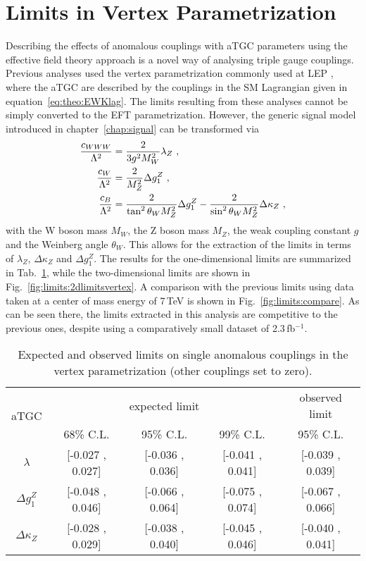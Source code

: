 \section{Limits in Vertex Parametrization}
\label{sec:vertex}
Describing the effects of anomalous couplings with aTGC parameters using the effective field theory approach is a novel way of analysing triple gauge couplings. Previous analyses used the vertex parametrization commonly used at LEP \cite{LEPatgc}, where the aTGC are described by the couplings in the SM Lagrangian given in equation~\ref{eq:theo:EWKlag}. The limits resulting from these analyses cannot be simply converted to the EFT parametrization. However, the generic signal model introduced in chapter~\ref{chap:signal} can be transformed via
\begin{align}
\frac{c_{WWW}}{\Lambda^2} &= \frac{2}{3g^2M_W^2}\lambda_Z ~, \\
\frac{c_{W}}{\Lambda^2}  &= \frac{2}{M_Z^2}\Delta g_1^Z ~, \\
\frac{c_{B}}{\Lambda^2}   &= \frac{2}{\tan^2\theta_W M_Z^2}\Delta g_1^Z - \frac{2}{\sin^2\theta_W M_Z^2}\Delta\kappa_Z ~,
\end{align}
with the W boson mass $M_W$, the Z boson mass $M_Z$, the weak coupling constant $g$ and the Weinberg angle $\theta_W$. This allows for the extraction of the limits in terms of $\lambda_Z$, $\Delta \kappa_Z$ and $\Delta g_1^Z$. The results for the one-dimensional limits are summarized in Tab.~\ref{tab:limits:1dlimits_vertex}, while the two-dimensional limits are shown in Fig.~\ref{fig:limits:2dlimitsvertex}. A comparison with the previous limits using data taken at a center of mass energy of 7\,TeV is shown in Fig.~\ref{fig:limits:compare}. As can be seen there, the limits extracted in this analysis are competitive to the previous ones, despite using a comparatively small dataset of 2.3\,fb$^{-1}$.

\begin{table}
	\centering
	\caption[Expected and observed limits on single anomalous couplings in the vertex parametrization]{Expected and observed limits on single anomalous couplings in the vertex parametrization (other couplings set to zero).}
	\label{tab:limits:1dlimits_vertex}
	\begin{tabular}{ccccc}
	\hline
	\multirow{2}{*}{aTGC}              &     \multicolumn{3}{c}{expected limit} & observed limit\\
	& 68\% C.L. & 95\% C.L. & 99\% C.L. & 95\% C.L.\\
	\hline
	$\lambda$          & [-0.027 , 0.027] & [-0.036 , 0.036] & [-0.041 , 0.041] & [-0.039 , 0.039] \\
	$\Delta g_1^Z$     & [-0.048 , 0.046] & [-0.066 , 0.064] & [-0.075 , 0.074] & [-0.067 , 0.066] \\
	$\Delta\kappa_Z$   & [-0.028 , 0.029] & [-0.038 , 0.040] & [-0.045 , 0.046] & [-0.040 , 0.041] \\
	\hline
	\end{tabular}
\end{table}

